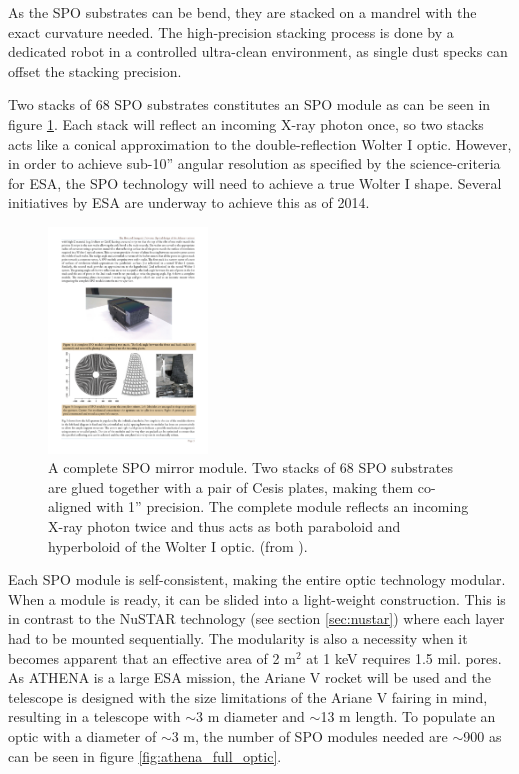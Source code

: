 As the SPO substrates can be bend, they are stacked on a mandrel with the exact curvature needed. The high-precision stacking process is done by a dedicated robot in a controlled ultra-clean environment, as single dust specks can offset the stacking precision.

Two stacks of 68 SPO substrates constitutes an SPO module as can be seen in figure \ref{fig:spo_stack}. Each stack will reflect an incoming X-ray photon once, so two stacks acts like a conical approximation to the double-reflection Wolter I optic. However, in order to achieve sub-10'' angular resolution as specified by the science-criteria for ESA, the SPO technology will need to achieve a true Wolter I shape. Several initiatives by ESA are underway to achieve this as of 2014.

\begin{figure}[!h]
  \center
  \includegraphics[height=6cm]{figures/athena/spo_stack.pdf}
\caption{\footnotesize A complete SPO mirror module. Two stacks of 68 SPO substrates are glued together with a pair of Cesis plates, making them co-aligned with 1'' precision. The complete module reflects an incoming X-ray photon twice and thus acts as both paraboloid and hyperboloid of the Wolter I optic. (from \cite{Willingale:2013vo}).}\label{fig:spo_stack}
\end{figure}

Each SPO module is self-consistent, making the entire optic technology modular. When a module is ready, it can be slided into a light-weight construction. This is in contrast to the NuSTAR technology (see section \ref{sec:nustar}) where each layer had to be mounted sequentially. The modularity is also a necessity when it becomes apparent that an effective area of 2 m$^2$ at 1 keV requires 1.5 mil. pores. As ATHENA is a large ESA mission, the Ariane V rocket will be used and the telescope is designed with the size limitations of the Ariane V fairing in mind, resulting in a telescope with $\sim$3 m diameter and $\sim$13 m length. To populate an optic with a diameter of $\sim$3 m, the number of SPO modules needed are $\sim$900 as can be seen in figure \ref{fig:athena_full_optic}.

